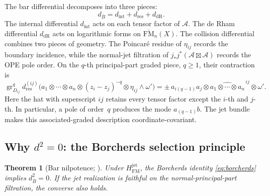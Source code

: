 \documentclass[11pt]{article}
\theoremstyle{plain}
\newtheorem{theorem}{Theorem}[section]
\theoremstyle{definition}
\theoremstyle{remark}
\newcommand{\FM}{\mathrm{FM}}
\newcommand{\cA}{\mathcal{A}}
\newcommand{\barB}{\overline{B}}
\begin{document}
The bar differential decomposes into three pieces:
\begin{equation}\label{eq:bar-diff}
d_{\barB} = d_{\mathrm{int}} + d_{\mathrm{res}} + d_{\mathrm{dR}}.
\end{equation}
The internal differential $d_{\mathrm{int}}$ acts on each tensor
factor of $\cA$. The de Rham differential $d_{\mathrm{dR}}$ acts
on logarithmic forms on $\overline{\FM}_n(X)$.  The collision
differential combines two pieces of geometry.  The Poincar\'e residue
of $\eta_{ij}$ records the boundary incidence, while the normal-jet
filtration of $j_*j^*(\cA\boxtimes\cA)$ records the OPE pole order.
On the $q$-th principal-part graded piece, $q\geq1$, their contraction
is
\begin{equation}\label{eq:res-diff}
 \operatorname{gr}^{q}_{D_{ij}}d_{\mathrm{res}}^{(ij)}
 \bigl(a_1\otimes\cdots\otimes a_n\otimes
       (z_i-z_j)^{-q}\otimes\eta_{ij}\wedge\omega'\bigr)
 =\pm\,a_{i(q-1)}a_j\otimes
       \widehat{a_1\otimes\cdots\otimes a_n}^{\,ij}
       \otimes\omega'.
\end{equation}
Here the hat with superscript $ij$ retains every tensor factor except
the $i$-th and $j$-th.  In particular, a pole of order~$q$ produces
the mode $a_{(q-1)}b$.  The jet bundle makes this associated-graded
description coordinate-covariant.

\subsection{Why $d^2 = 0$: the Borcherds selection principle}

\begin{theorem}[Bar nilpotence; \ClaimStatusConditional]
\label{thm:bar-nilpotence}
Under $H_{\mathrm{FM}}^{\mathrm{jet}}$, the Borcherds identity
\eqref{eq:borcherds} implies $d_{\barB}^2=0$.  If the jet realization
is faithful on the normal-principal-part filtration, the converse also
holds.
\end{theorem}
\end{document}

